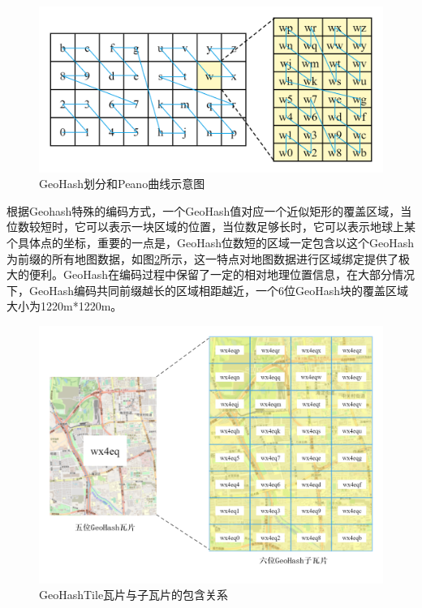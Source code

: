 \begin{figure}
  \centering
  \includegraphics[width=1.0\textwidth]{figures/peano}
  \caption{GeoHash划分和Peano曲线示意图}\label{fig:peano}
\end{figure}


根据Geohash特殊的编码方式，一个GeoHash值对应一个近似矩形的覆盖区域，当位数较短时，它可以表示一块区域的位置，当位数足够长时，它可以表示地球上某个具体点的坐标，重要的一点是，GeoHash位数短的区域一定包含以这个GeoHash为前缀的所有地图数据，如图\ref{fig:fatherAndSon}所示，这一特点对地图数据进行区域绑定提供了极大的便利。GeoHash在编码过程中保留了一定的相对地理位置信息，在大部分情况下，GeoHash编码共同前缀越长的区域相距越近，一个6位GeoHash块的覆盖区域大小为1220m*1220m。\par

\begin{figure}
  \centering
  \includegraphics[width=1.0\textwidth]{figures/瓦片与子瓦片}
  \caption{GeoHashTile瓦片与子瓦片的包含关系}\label{fig:fatherAndSon}
\end{figure}


